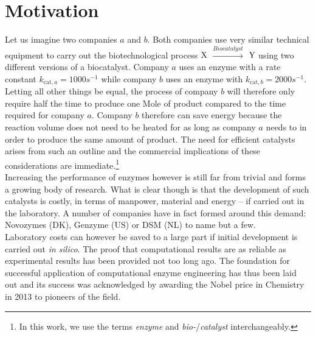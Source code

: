 \section{Motivation}\label{sec:mot}
Let us imagine two companies $a$ and $b$.
Both companies use very similar technical equipment to carry out the biotechnological process $\ce{X}$ $\xrightarrow{Biocatalyst}$ $\ce{Y}$ using two different versions of a biocatalyst.
Company $a$ uses an enzyme with a rate constant $k_{\text{cat},a} = 1000s^{-1}$ while company $b$ uses an enzyme with $k_{\text{cat},b} = 2000s^{-1}$.
Letting all other things be equal, the process of company $b$ will therefore only require half the time to produce one Mole of product compared to the time required for company $a$.
Company $b$ therefore can save energy because the reaction volume does not need to be heated for as long as company $a$ needs to in order to produce the same amount of product.
The need for efficient catalysts arises from such an outline and the commercial implications of these considerations are immediate.\footnote{In this work, we use the terms \textit{enzyme} and \textit{bio-}/\textit{catalyst} interchangeably.}\\
Increasing the performance of enzymes however is still far from trivial and forms a growing body of research.
What is clear though is that the development of such catalysts is costly, in terms of manpower, material and energy -- if carried out in the laboratory.
A number of companies have in fact formed around this demand: Novozymes (DK), Genzyme (US) or DSM (NL) to name but a few\cite{ kirk2002industrial, beilen2002enzyme, schmid2002use, meyer2013use}.\\
Laboratory costs can however be saved to a large part if initial development is carried out \textit{in silico}.
The proof that computational results are as reliable as experimental results has been provided not too long ago\cite{claeyssens2006high}.
The foundation for successful application of computational enzyme engineering has thus been laid out and its success was acknowledged by awarding the Nobel price in Chemistry in 2013 to pioneers of the field.


